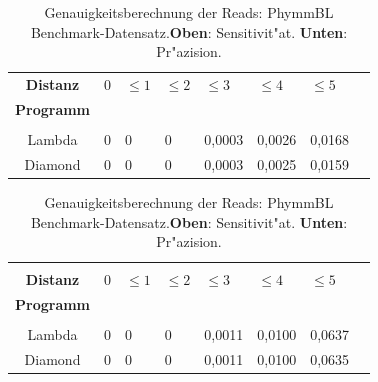 \documentclass[10pt, a4paper]{report}[08.12.2015]
\begin{document}
      \begin{table}[H]
        \begin{tabular}{clllllll}
          \textbf{Distanz}&0&$\leq1$&$\leq2$&$\leq3$&$\leq4$&$\leq5$\\
          \textbf{Programm}&&&&&\\ \hline  
          &&&&&&\\
          Lambda&0&0&0&0,0003&0,0026&0,0168\\
          Diamond&0&0&0&0,0003&0,0025&0,0159\\
        \end{tabular}

        \begin{tabular}{clllllll}
        &&&&&&\\
          \textbf{Distanz}&0&$\leq1$&$\leq2$&$\leq3$&$\leq4$&$\leq5$\\
          \textbf{Programm}&&&&&\\ \hline  
          &&&&&&\\
          Lambda&0&0&0&0,0011&0,0100&0,0637\\
          Diamond&0&0&0&0,0011&0,0100&0,0635\\
        \end{tabular}
        \caption[Genauigkeitsberechnung der Reads: PhymmBL Benchmark-Datensatz.]{\small{Genauigkeitsberechnung der Reads: PhymmBL Benchmark-Datensatz.\newline \textbf{Oben}: Sensitivit"at. \textbf{Unten}: Pr"azision.} }
        \label{tab:phymmbl}
      \end{table}
\end{document}

